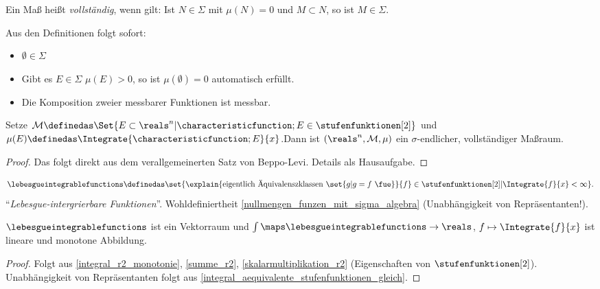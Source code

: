 Ein Maß heißt \emph{vollständig}, wenn gilt: Ist \( N\in \Sigma \) mit \( \mu(N)=0 \) und \( M\subset N \), so ist \( M\in \Sigma \).
\begin{bemerkung*}
  Aus den Definitionen folgt sofort:
  \begin{itemize}
    \item \( \emptyset\in \Sigma \)
    \item Gibt es \( E\in \Sigma \) \sd \( \mu(E)>0 \), so ist \( \mu(\emptyset)=0 \) automatisch erfüllt.
    \item Die Komposition zweier messbarer Funktionen ist messbar.
  \end{itemize}
\end{bemerkung*}
\begin{satz}\label{massraum_integration}
   Setze \( \mathcal{M}\definedas \Set{E\subset \reals^n|\characteristicfunction;{E}\in \stufenfunktionen[2]} \) und \( \mu(E)\definedas \Integrate{\characteristicfunction;{E}}{x} \).Dann ist \( (\reals^n,\mathcal{M},\mu) \) ein \( \sigma \)-endlicher, vollständiger Maßraum.
\end{satz}
\begin{proof}
  Das folgt direkt aus dem verallgemeinerten Satz von Beppo-Levi. Details als Hausaufgabe.
\end{proof}
\begin{definition*}
  \begin{equation*}
    \lebesgueintegrablefunctions\definedas \set{\explain{\text{eigentlich Äquivalenszklassen }\set{g|g=f \text{ \fue}}}{f}\in \stufenfunktionen[2]|\Integrate{f}{x}<\infty}.
  \end{equation*}
  \enquote{\emph{Lebesgue-intergrierbare Funktionen}}. Wohldefiniertheit \ref{nullmengen_funzen_mit_sigma_algebra} (Unabhängigkeit von Repräsentanten!). 
\end{definition*}
\begin{proposition}\label{lebesgue_integrable_funktionen_vektorraum}
  \( \lebesgueintegrablefunctions \) ist ein Vektorraum und \( \int \maps \lebesgueintegrablefunctions\to \reals \), \( f\mapsto \Integrate{f}{x} \) ist lineare und monotone Abbildung.
\end{proposition}
\begin{proof}
  Folgt aus \ref{integral_r2_monotonie}, \ref{summe_r2}, \ref{skalarmultiplikation_r2} (Eigenschaften von \( \stufenfunktionen[2] \)). Unabhängigkeit von Repräsentanten folgt aus \ref{integral_aequivalente_stufenfunktionen_gleich}.
  
\end{proof}
